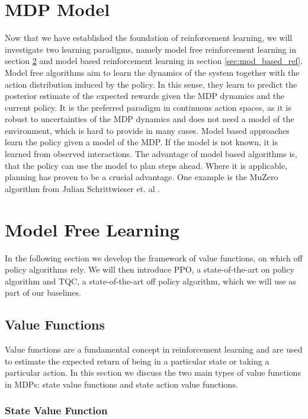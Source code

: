 \section{MDP Model}
Now that we have established the foundation of reinforcement learning, we will investigate two learning paradigms, 
namely model free reinforcement learning in section \ref{sec:mod_free_ref} and model based reinforcement learning in section \ref{sec:mod_based_ref}. \\

Model free algorithms aim to learn the dynamics of the system together with the action distribution induced by the policy. In this sense, they learn to predict the posterior 
estimate of the expected rewards given the MDP dynamics and the current policy. It is the preferred paradigm in continuous action spaces, 
as it is robust to uncertainties of the MDP dynamics and does not need a model of the environment, which is hard to provide in many cases. 
Model based approaches learn the policy given a model of the MDP. If the model is not known, it is learned 
from observed interactions. The advantage of model based algorithms is, that the policy can use the model to plan steps ahead. 
Where it is applicable, planning has proven to be 
a crucial advantage. One example is the MuZero algorithm from Julian Schrittwieser et. al \cite{MUZero}.

\section{Model Free Learning}
\label{sec:mod_free_ref}
In the following section we develop the framework of value functions, on which off policy algorithms rely. 
We will then introduce PPO, a state-of-the-art on policy algorithm and TQC, a state-of-the-art off policy algorithm, 
which we will use as part of our baselines.

\subsection{Value Functions}

Value functions are a fundamental concept in reinforcement learning and are used to estimate the expected return of being in a 
particular state or taking a particular action. In this section we discuss the two main types of value functions in MDPs: state 
value functions and state action value functions.

\subsubsection{State Value Function}

